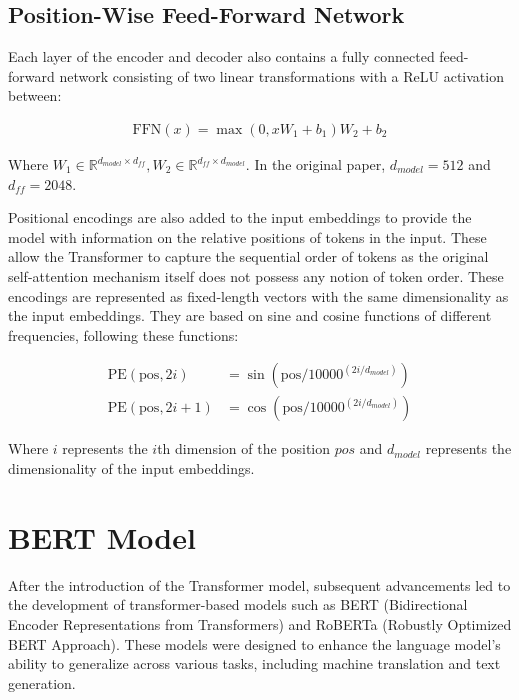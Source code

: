 \subsection{Position-Wise Feed-Forward Network}

Each layer of the encoder and decoder also contains a fully connected feed-forward network consisting of two linear transformations with a ReLU activation between:

\begin{equation}
    \begin{gathered}
        \text{FFN}(x) = \max \left(0, xW_{1} + b_{1}\right)W_{2} + b_{2}
    \end{gathered}
    \label{eq:ffnn}
\end{equation}

Where $W_1 \in \mathbb{R}^{d_{model} \times d_{ff}}, W_2 \in \mathbb{R}^{d_{ff} \times d_{model}}$. In the original paper, $d_{model} = 512$ and $d_{ff} = 2048$.

Positional encodings are also added to the input embeddings to provide the model with information on the relative positions of tokens in the input. These allow the Transformer to capture the sequential order of tokens as the original self-attention mechanism itself does not possess any notion of token order. These encodings are represented as fixed-length vectors with the same dimensionality as the input embeddings. They are based on sine and cosine functions of different frequencies, following these functions:

\begin{equation}
    \begin{aligned}
        \text{PE}(\text{pos}, 2i)     & = \sin\left(\text{pos} / 10000^{(2i/d_{model})}\right) \\
        \text{PE}(\text{pos}, 2i + 1) & = \cos\left(\text{pos} / 10000^{(2i/d_{model})}\right)
    \end{aligned}
    \label{eq:pos_embedding}
\end{equation}

Where $i$ represents the $i$th dimension of the position $pos$ and $d_{model}$ represents the dimensionality of the input embeddings.


\section{BERT Model}
\label{sec:BERT}
After the introduction of the Transformer model, subsequent advancements led to the development of transformer-based models such as BERT (Bidirectional Encoder Representations from Transformers) and RoBERTa (Robustly Optimized BERT Approach). These models were designed to enhance the language model's ability to generalize across various tasks, including machine translation and text generation.

